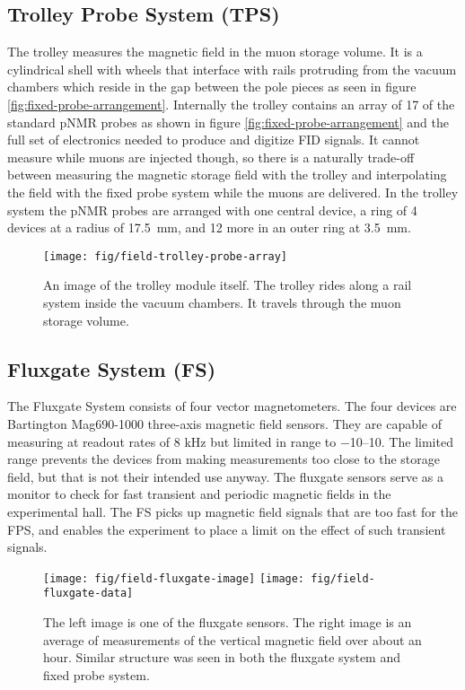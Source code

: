 \subsection{Trolley Probe System (TPS)}

The trolley measures the magnetic field in the muon storage volume.  It is a cylindrical shell with wheels that interface with rails protruding from the vacuum chambers which reside in the gap between the pole pieces as seen in figure \ref{fig:fixed-probe-arrangement}.  Internally the trolley contains an array of 17 of the standard pNMR probes as shown in figure \ref{fig:fixed-probe-arrangement} and the full set of electronics needed to produce and digitize FID signals.  It cannot measure while muons are injected though, so there is a naturally trade-off between measuring the magnetic storage field with the trolley and interpolating the field with the fixed probe system while the muons are delivered. In the trolley system the pNMR probes are arranged with one central device, a ring of 4 devices at a radius of \SI{17.5}{\mm}, and 12 more in an outer ring at \SI{3.5}{\mm}.

\begin{figure}
\label{fig:field-trolley-probe-array}
\centering
\texttt{[image: fig/field-trolley-probe-array]}
\caption{An image of the trolley module itself.  The trolley rides along a rail system inside the vacuum chambers.  It travels through the muon storage volume.}
\end{figure}

\subsection{Fluxgate System (FS)}

The Fluxgate System consists of four vector magnetometers.  The four devices are Bartington Mag690-1000 three-axis magnetic field sensors.  They are capable of measuring at readout rates of 8 kHz but limited in range to \SIrange{-10}{+10}{\gauss}.  The limited range prevents the devices from making measurements too close to the storage field, but that is not their intended use anyway.  The fluxgate sensors serve as a monitor to check for fast transient and periodic magnetic fields in the experimental hall.  The FS picks up magnetic field signals that are too fast for the FPS, and enables the experiment to place a limit on the effect of such transient signals.

\begin{figure}
\label{fig:field-fluxgates}
\texttt{[image: fig/field-fluxgate-image]}
\texttt{[image: fig/field-fluxgate-data]}
\caption{The left image is one of the fluxgate sensors.  The right image is an average of measurements of the vertical magnetic field over about an hour.  Similar structure was seen in both the fluxgate system and fixed probe system.}
\end{figure}


